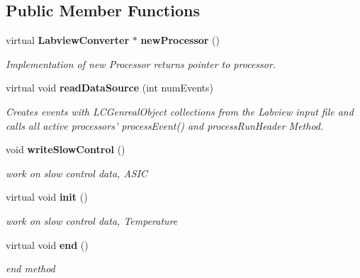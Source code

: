 \subsection*{Public Member Functions}
\begin{DoxyCompactItemize}
\item 
virtual {\bf Labview\-Converter} $\ast$ {\bf new\-Processor} ()\label{classmarlin_1_1LabviewConverter_ac445a8f712cbc96fd9f90c190dad8347}

\begin{DoxyCompactList}\small\item\em Implementation of new Processor returns pointer to processor. \end{DoxyCompactList}\item 
virtual void {\bf read\-Data\-Source} (int num\-Events)\label{classmarlin_1_1LabviewConverter_ad865613e9671e541a1e64ecd8c9c897b}

\begin{DoxyCompactList}\small\item\em Creates events with L\-C\-Genreal\-Object collections from the Labview input file and calls all active processors' process\-Event() and process\-Run\-Header Method. \end{DoxyCompactList}\item 
void {\bf write\-Slow\-Control} ()\label{classmarlin_1_1LabviewConverter_a3e5cfb39a19c0ca17ac3ecdb3c9f85e7}

\begin{DoxyCompactList}\small\item\em work on slow control data, A\-S\-I\-C \end{DoxyCompactList}\item 
virtual void {\bf init} ()
\begin{DoxyCompactList}\small\item\em work on slow control data, Temperature \end{DoxyCompactList}\item 
virtual void {\bf end} ()\label{classmarlin_1_1LabviewConverter_ae1700a9004281db26476d22b5cc7c10b}

\begin{DoxyCompactList}\small\item\em end method \end{DoxyCompactList}\end{DoxyCompactItemize}

